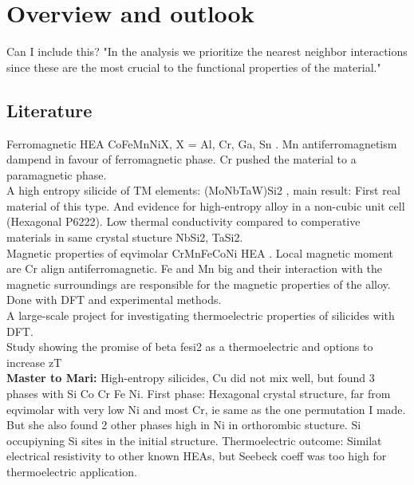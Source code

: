 \chapter{Overview and outlook}
\label{sec:overview}

Can I include this? "In the analysis we prioritize the nearest neighbor interactions since these are the most crucial to the functional properties of the material."

\section{Literature}

Ferromagnetic HEA CoFeMnNiX, X = Al, Cr, Ga, Sn	\cite{ZUO201710}. Mn antiferromagnetism dampend in favour of ferromagnetic phase. Cr pushed the material to a paramagnetic phase. \\

A high entropy silicide  of TM elements: (MoNbTaW)Si2 \cite{GILD2019337}, main result: First real material of this type. And evidence for high-entropy alloy in a non-cubic unit cell (Hexagonal P6222). Low thermal conductivity compared to comperative materials in same crystal stucture NbSi2, TaSi2.  \\

Magnetic properties of eqvimolar CrMnFeCoNi HEA \cite{PhysRevB.96.014437}. Local magnetic moment are Cr align antiferromagnetic. Fe and Mn big and their interaction with the magnetic surroundings are responsible for the magnetic properties of the alloy. Done with DFT and experimental methods. \\

A large-scale project for investigating thermoelectric properties of silicides \cite{doi:10.1063/5.0008198} with DFT. \\

Study showing the promise of beta fesi2 as a thermoelectric and options to increase zT \cite{doi:10.1021/acsami.0c00321} \\

\textbf{Master to Mari:} High-entropy silicides, Cu did not mix well, but found 3 phases with Si Co Cr Fe Ni. First phase: Hexagonal crystal structure, far from eqvimolar with very low Ni and most Cr, ie same as the one permutation I made. But she also found 2 other phases high in Ni in orthorombic stucture. Si occupiyning Si sites in the initial structure. Thermoelectric outcome: Similat electrical resistivity to other known HEAs, but Seebeck coeff was too high for thermoelectric application. \\

